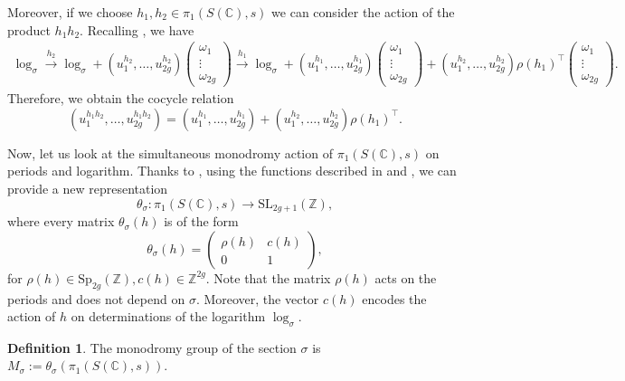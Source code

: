 \documentclass[10 pt,a4paper]{article}
\theoremstyle{plain}
\theoremstyle{definition}
\newtheorem{defn}[thm]{Definition}
\theoremstyle{named}
\newcommand{\bC}{\mathbb C}
\newcommand{\bZ}{\mathbb Z}
\begin{document}
Moreover, if we choose $h_1,h_2 \in \pi_1(S(\bC),s)$ we can consider the action of the product $h_1h_2$. Recalling , we have
\begin{align*}
	\log_\sigma \xrightarrow{h_2} \log_\sigma + (u_1^{h_2},\ldots, u_{2g}^{h_2})\left(\begin{matrix} \omega_1\\ \vdots \\ \omega_{2g}\end{matrix}\right) \xrightarrow{h_1} \log_\sigma + (u_1^{h_1},\ldots, u_{2g}^{h_1})\left(\begin{matrix} \omega_1\\ \vdots \\ \omega_{2g}\end{matrix}\right) + (u_1^{h_2},\ldots, u_{2g}^{h_2})\rho(h_1)^\top\left(\begin{matrix} \omega_1\\ \vdots \\ \omega_{2g}\end{matrix}\right).
\end{align*}
Therefore, we obtain the cocycle relation
\begin{equation}\label{eq:cocycle}
    (u_1^{h_1h_2},\ldots, u_{2g}^{h_1h_2}) = (u_1^{h_1},\ldots, u_{2g}^{h_1}) + (u_1^{h_2},\ldots, u_{2g}^{h_2})\rho(h_1)^\top.
\end{equation}

Now, let us look at the simultaneous monodromy action of $\pi_1(S(\bC),s)$  on periods and logarithm. Thanks to , using the functions described in  and , we can provide a new representation
\[
\theta_\sigma: \pi_1(S(\bC),s) \rightarrow \textrm{SL}_{2g+1}(\bZ),
\]
where every matrix $\theta_\sigma(h)$ is of the form
\begin{equation}\label{simultaneousRepresentation}
	\theta_\sigma(h)=\left( \begin{matrix} \rho(h) & c(h) \\ 0 & 1 \end{matrix} \right),
\end{equation}
for $\rho(h) \in \textrm{Sp}_{2g}(\bZ), c(h) \in \bZ^{2g}$. Note that the matrix $\rho(h)$ acts on the periods and does not depend on $\sigma$. Moreover, the vector $c(h)$ encodes the action of $h$ on determinations of the logarithm $\log_\sigma$. 

\begin{defn}
The monodromy group of the section $\sigma$ is $M_\sigma:=\theta_\sigma(\pi_1(S(\bC),s))$.
\end{defn}
\end{document}
